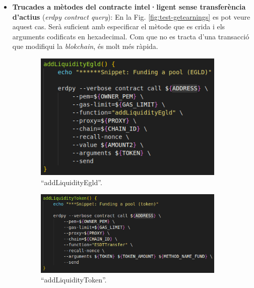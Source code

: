 \documentclass[11pt,a4paper]{article}
\begin{document}
\begin{itemize}
\begin{itemize}
	\end{itemize}
	\item \textbf{Trucades a mètodes del contracte intel·ligent sense transferència d'actius} (\textit{erdpy contract query}): En la Fig. \ref{fig:test-getearnings} es pot veure aquest cas. Serà suficient amb especificar el mètode que es crida i els arguments codificats en hexadecimal. Com que no es tracta d'una transacció que modifiqui la \textit{blokchain}, és molt més ràpida.
\end{itemize}

\begin{figure}[!htb]
	\begin{subfigure}[b]{0.40\textwidth}
	  \includegraphics[width=\linewidth]{test-addegld.png}
	  \caption{``addLiquidityEgld''.}\label{fig:test-addegldsnip}
	\end{subfigure}\hfill
	\begin{subfigure}[b]{0.55\textwidth}
	  \includegraphics[width=\linewidth]{test-addtoken.png}
	  \caption{``addLiquidityToken''.}\label{fig:test-addtokensnip}
	\end{subfigure}\hfill
	\begin{subfigure}[b]{0.46\textwidth}

\end{subfigure}
\end{figure}
\end{document}
